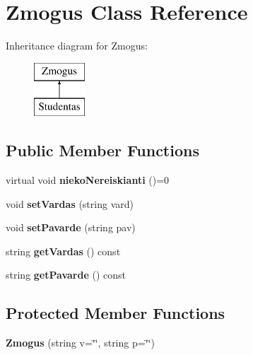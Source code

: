 \hypertarget{class_zmogus}{}\section{Zmogus Class Reference}
\label{class_zmogus}
Inheritance diagram for Zmogus\+:\begin{figure}[H]
\begin{center}
\leavevmode
\includegraphics[height=2.000000cm]{class_zmogus}
\end{center}
\end{figure}
\subsection*{Public Member Functions}
\begin{DoxyCompactItemize}
\item 
\mbox{\label{class_zmogus_a89720ec31f08131b9d35b37a4d0a2938}} 
virtual void {\bfseries nieko\+Nereiskianti} ()=0
\item 
\mbox{\label{class_zmogus_a0facff7a51ec306b27abc5d2b1916bc1}} 
void {\bfseries set\+Vardas} (string vard)
\item 
\mbox{\label{class_zmogus_aa7acc749a4d555cca7e92ea2db4cab97}} 
void {\bfseries set\+Pavarde} (string pav)
\item 
\mbox{\label{class_zmogus_aaea44664c236e2fadf022f3821862499}} 
string {\bfseries get\+Vardas} () const
\item 
\mbox{\label{class_zmogus_a11ee9ac120fbb7d6a4e1f4da3a602b63}} 
string {\bfseries get\+Pavarde} () const
\end{DoxyCompactItemize}
\subsection*{Protected Member Functions}
\begin{DoxyCompactItemize}
\item 
\mbox{\label{class_zmogus_ab37b701d317bcedf500a10467b277cf8}} 
{\bfseries Zmogus} (string v=\char`\"{}\char`\"{}, string p=\char`\"{}\char`\"{})
\end{DoxyCompactItemize}
